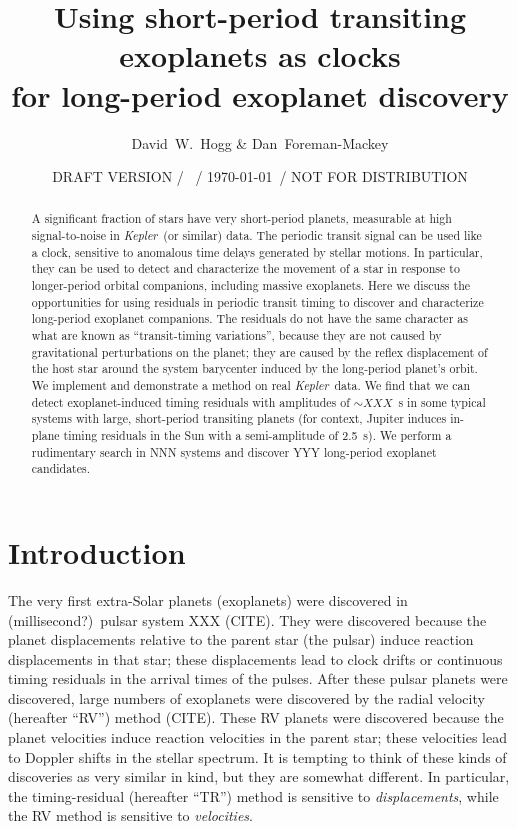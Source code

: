 \documentclass[12pt, preprint]{aastex}
\newcounter{affil}
\newcommand{\project}[1]{\textsl{#1}}
\newcommand{\Kepler}{\project{Kepler}}
\begin{document}
\title{
  Using short-period transiting exoplanets as clocks \\
  for long-period exoplanet discovery
}
\author{
  David~W.~Hogg\altaffilmark{\ref{ccpp},\ref{cds},\ref{mpia},\ref{email}}
  \&
  Dan~Foreman-Mackey\altaffilmark{\ref{ccpp}}
}
\date{DRAFT VERSION / \texttt{\githash}\ / \today\ / NOT FOR DISTRIBUTION}
\label{ccpp}
\label{cds}
\label{mpia}
\label{email}

\begin{abstract}
A significant fraction of stars have very short-period planets,
measurable at high signal-to-noise in \Kepler\ (or similar) data.
The periodic transit signal can be used like a clock, sensitive to
anomalous time delays generated by stellar motions.
In particular, they can be used to detect and characterize the
movement of a star in response to longer-period orbital companions,
including massive exoplanets.
Here we discuss the opportunities for using residuals in periodic
transit timing to discover and characterize long-period exoplanet
companions.
The residuals do not have the same character as what are known as
``transit-timing variations'', because they are not caused by
gravitational perturbations on the planet; they are caused by the
reflex displacement of the host star around the system barycenter
induced by the long-period planet's orbit.
We implement and demonstrate a method on real \Kepler\ data.  We find
that we can detect exoplanet-induced timing residuals with amplitudes
of $\sim XXX$~s in some typical systems with large, short-period
transiting planets (for context, Jupiter induces in-plane timing residuals in
the Sun with a semi-amplitude of 2.5~s).
We perform a rudimentary search in NNN systems and discover YYY
long-period exoplanet candidates.
\end{abstract}

\section{Introduction}

The very first extra-Solar planets (exoplanets) were discovered in
(millisecond?)\ pulsar system XXX (CITE).
They were discovered because the planet displacements relative to the
parent star (the pulsar) induce reaction displacements in that star;
these displacements lead to clock drifts or continuous timing
residuals in the arrival times of the pulses.
After these pulsar planets were discovered, large numbers of
exoplanets were discovered by the radial velocity (hereafter ``RV'') method (CITE).
These RV planets were discovered because the planet velocities induce
reaction velocities in the parent star; these velocities lead to
Doppler shifts in the stellar spectrum.
It is tempting to think of these kinds of discoveries as very similar
in kind, but they are somewhat different.
In particular, the timing-residual (hereafter ``TR'') method is
sensitive to \emph{displacements}, while the RV method is sensitive to
\emph{velocities}.
\end{document}
